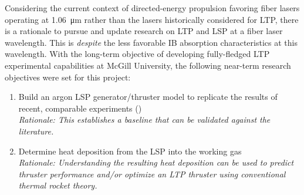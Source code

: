         Considering the current context of directed-energy propulsion favoring fiber lasers operating at \qty{1.06}{\um} rather than the  lasers historically considered for LTP, there is a rationale to pursue and update research on LTP and LSP at a fiber laser wavelength. This is \emph{despite} the less favorable IB absorption characteristics at this wavelength. With the long-term objective of developing fully-fledged LTP experimental capabilities at McGill University, the following near-term research objectives were set for this project:
        \begin{enumerate}
            \item Build an argon LSP generator/thruster model to replicate the results of recent, comparable experiments (\cite{matsuiGeneratingConditionsArgon2019,zimakovInteractionNearIRLaser2016,luCharacteristicDiagnosticsLaserStabilized2022}) \\
                \textit{Rationale: This establishes a baseline that can be validated against the literature.}
            \item Determine heat deposition from the LSP into the working gas \\
                \textit{Rationale: Understanding the resulting heat deposition can be used to predict thruster performance and/or optimize an LTP thruster using conventional thermal rocket theory.}
        \end{enumerate}
